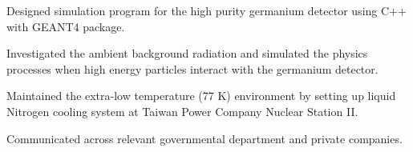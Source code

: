 \documentclass[letterpaper]{deedy-resume-openfont}
\begin{document}
\begin{tightemize}
\item Designed simulation program for the high purity germanium detector using C++ with GEANT4 package.%
\item Investigated the ambient background radiation and simulated the physics processes when high energy particles interact with the germanium detector.
\item Maintained the extra-low temperature (77 K) environment by setting up liquid Nitrogen cooling system at Taiwan Power Company Nuclear Station II.
\item Communicated across relevant governmental department and private companies.
\end{tightemize}
\sectionsep
\end{document}
